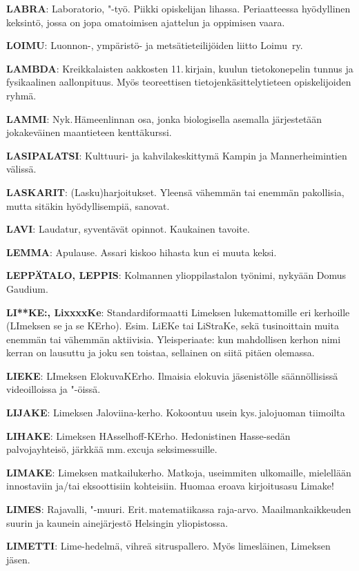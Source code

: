 \documentclass[../ala_hataile.tex]{subfiles}
\begin{document}
\textbf{LABRA}: Laboratorio, "-työ. Piikki opiskelijan
lihassa. Periaatteessa hyödyllinen
keksintö, jossa on jopa omatoimisen ajattelun
ja oppimisen vaara.

\textbf{LOIMU}: Luonnon-, ympäristö- ja metsätieteilijöiden liitto Loimu~ry.

\textbf{LAMBDA}: Kreikkalaisten aakkosten 11.\,kirjain, kuulun tietokonepelin tunnus ja fysikaalinen aallonpituus. Myös teoreettisen
tietojen\-käsittelytieteen opiskelijoiden ryhmä.

\textbf{LAMMI}: Nyk.\,Hämeenlinnan osa, jonka
biologisella asemalla järjestetään jokakeväinen
maantieteen kenttäkurssi.

\textbf{LASIPALATSI}: Kulttuuri- ja kahvilakeskittymä
Kampin ja Mannerheimintien välissä.

\textbf{LASKARIT}: (Lasku)harjoitukset. Yleensä
vähemmän tai enemmän pakollisia, mutta
sitäkin hyödyllisempiä, sanovat.

\textbf{LAVI}: Laudatur, syventävät opinnot. Kaukainen
tavoite.

\textbf{LEMMA}: Apulause. Assari kiskoo hihasta
kun ei muuta keksi.

\textbf{LEPPÄTALO, LEPPIS}: Kolmannen
ylioppilastalon työnimi, nykyään Domus
Gaudium.

\textbf{LI**KE:, LixxxxKe}: Standardiformaatti
Limeksen lukemattomille eri kerhoille (LImeksen se ja se KErho). Esim. LiEKe tai
LiStraKe, sekä tusinoittain muita enemmän
tai vähemmän aktiivisia. Yleisperiaate:
kun mahdollisen kerhon nimi kerran on
lausuttu ja joku sen toistaa, sellainen on
siitä pitäen olemassa.

\textbf{LIEKE}: LImeksen ElokuvaKErho. Ilmaisia
elokuvia jäsenistölle säännöllisissä videoilloissa
ja "-öissä.

\textbf{LIJAKE}: Limeksen Jaloviina-kerho. Kokoontuu
usein kys.\,jalojuoman tiimoilta

\textbf{LIHAKE}: Limeksen HAsselhoff-KErho.
Hedonistinen Hasse-sedän palvojayhteisö,
järkkää mm.\,excuja seksimessuille.

\textbf{LIMAKE}: Limeksen matkailukerho. Matkoja,
useimmiten ulkomaille, mielellään
innostaviin ja/tai eksoottisiin kohteisiin.
Huomaa eroava kirjoitusasu Limake!

\textbf{LIMES}: Rajavalli, "-muuri. Erit.\,matematiikassa
raja-arvo. Maailmankaikkeuden
suurin ja kaunein ainejärjestö Helsingin
yliopistossa.

\textbf{LIMETTI}: Lime-hedelmä, vihreä sitruspallero.
Myös limesläinen, Limeksen jäsen.
\end{document}
